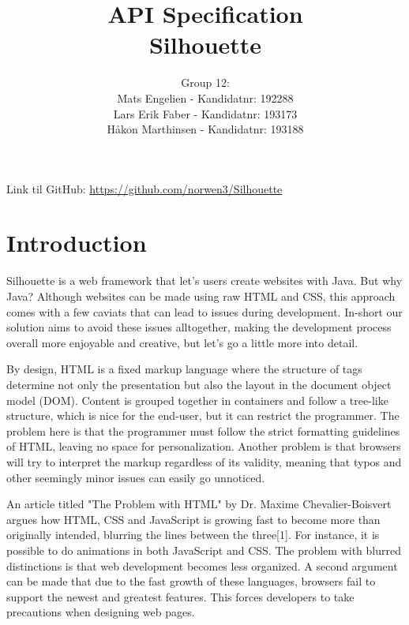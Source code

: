 \documentclass[12pt]{article}
\begin{document}
\title{%
    API Specification\\
    \large Silhouette}
\author{%
    Group 12:\\
    Mats Engelien - Kandidatnr: 192288\\
    Lars Erik Faber - Kandidatnr: 193173\\
    Håkon Marthinsen - Kandidatnr: 193188}
\date{}
\maketitle

\thispagestyle{empty}

\newpage

\tableofcontents

\thispagestyle{empty}

\newpage

\setcounter{page}{1}

Link til GitHub: \href{https://github.com/norwen3/Silhouette}{https://github.com/norwen3/Silhouette}

\section{Introduction}

Silhouette is a web framework that let's users create websites with Java. But why Java? Although websites can be made using raw HTML and CSS, this approach comes with a few caviats that can lead to issues during development. In-short our solution aims to avoid these issues alltogether, making the development process overall more enjoyable and creative, but let's go a little more into detail.

By design, HTML is a fixed markup language where the structure of tags determine not only the presentation but also the layout in the document object model (DOM). Content is grouped together in containers and follow a tree-like structure, which is nice for the end-user, but it can restrict the programmer. The problem here is that the programmer must follow the strict formatting guidelines of HTML, leaving no space for personalization. Another problem is that browsers will try to interpret the markup regardless of its validity, meaning that typos and other seemingly minor issues can easily go unnoticed.

An article titled "The Problem with HTML" by Dr. Maxime Chevalier-Boisvert argues how HTML, CSS and JavaScript is growing fast to become more than originally intended, blurring the lines between the three[1]. For instance, it is possible to do animations in both JavaScript and CSS. The problem with blurred distinctions is that web development becomes less organized. A second argument can be made that due to the fast growth of these languages, browsers fail to support the newest and greatest features. This forces developers to take precautions when designing web pages.
\end{document}
